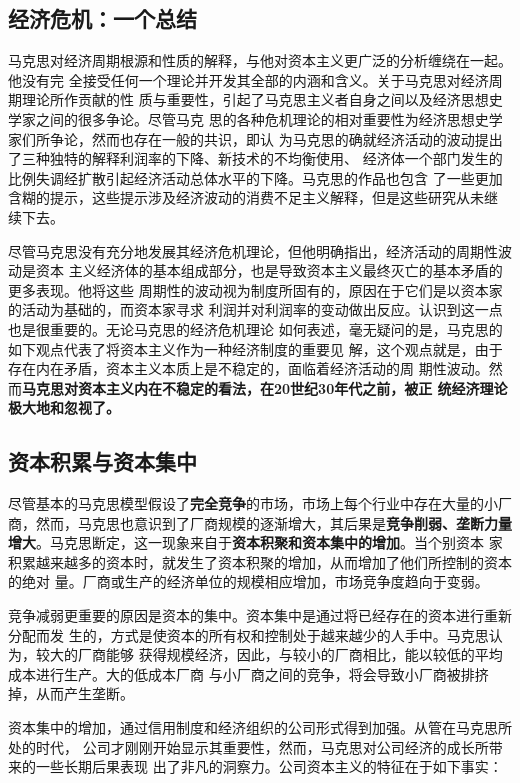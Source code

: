 \subsection{经济危机：一个总结}

马克思对经济周期根源和性质的解释，与他对资本主义更广泛的分析缠绕在一起。他没有完
全接受任何一个理论并开发其全部的内涵和含义。关于马克思对经济周期理论所作贡献的性
质与重要性，引起了马克思主义者自身之间以及经济思想史学家之间的很多争论。尽管马克
思的各种危机理论的相对重要性为经济思想史学家们所争论，然而也存在一般的共识，即认
为马克思的确就经济活动的波动提出了三种独特的解释利润率的下降、新技术的不均衡使用、
经济体一个部门发生的比例失调经扩散引起经济活动总体水平的下降。马克思的作品也包含
了一些更加含糊的提示，这些提示涉及经济波动的消费不足主义解释，但是这些研究从未继
续下去。

尽管马克思没有充分地发展其经济危机理论，但他明确指出，经济活动的周期性波动是资本
主义经济体的基本组成部分，也是导致资本主义最终灭亡的基本矛盾的更多表现。他将这些
周期性的波动视为制度所固有的，原因在于它们是以资本家的活动为基础的，而资本家寻求
利润并对利润率的变动做出反应。认识到这一点也是很重要的。无论马克思的经济危机理论
如何表述，毫无疑问的是，马克思的如下观点代表了将资本主义作为一种经济制度的重要见
解，这个观点就是，由于存在内在矛盾，资本主义本质上是不稳定的，面临着经济活动的周
期性波动。然而\textbf{马克思对资本主义内在不稳定的看法，在20世纪30年代之前，被正
  统经济理论极大地和忽视了。}

\subsection{资本积累与资本集中}

尽管基本的马克思模型假设了\textbf{完全竞争}的市场，市场上每个行业中存在大量的小厂
商，然而，马克思也意识到了厂商规模的逐渐增大，其后果是\textbf{竞争削弱、垄断力量
  增大}。马克思断定，这一现象来自于\textbf{资本积聚和资本集中的增加}。当个别资本
家积累越来越多的资本时，就发生了资本积聚的增加，从而增加了他们所控制的资本的绝对
量。厂商或生产的经济单位的规模相应增加，市场竞争度趋向于变弱。

竞争减弱更重要的原因是资本的集中。资本集中是通过将已经存在的资本进行重新分配而发
生的，方式是使资本的所有权和控制处于越来越少的人手中。马克思认为，较大的厂商能够
获得规模经济，因此，与较小的厂商相比，能以较低的平均成本进行生产。大的低成本厂商
与小厂商之间的竞争，将会导致小厂商被排挤掉，从而产生垄断。

资本集中的增加，通过信用制度和经济组织的公司形式得到加强。从管在马克思所处的时代，
公司才刚刚开始显示其重要性，然而，马克思对公司经济的成长所带来的一些长期后果表现
出了非凡的洞察力。公司资本主义的特征在于如下事实：

